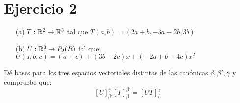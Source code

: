 \section*{Ejercicio 2}

\begin{itemize}
    \item[(a)] $T: \mathbb{R}^{2} \rightarrow \mathbb{R}^{3}$ tal que $T(a,b) = (2a + b, -3a -2b, 3b)$
    
    \item[(b)] $U: \mathbb{R}^{3} \rightarrow P_{2}(R)$ tal que $U(a,b,c) = (a + c) + (3b - 2c)x + (-2a + b -4c)x^{2}$
\end{itemize}

Dé bases para los tres espacios vectoriales distintas de las canónicas $\beta, \beta', \gamma$ y compruebe que:
\begin{equation}
    \left[ U \right]_{\beta'}^{\gamma} \left[ T \right]_{\beta}^{\beta'} = \left[ UT \right]_{\beta}^{\gamma}    
\end{equation}